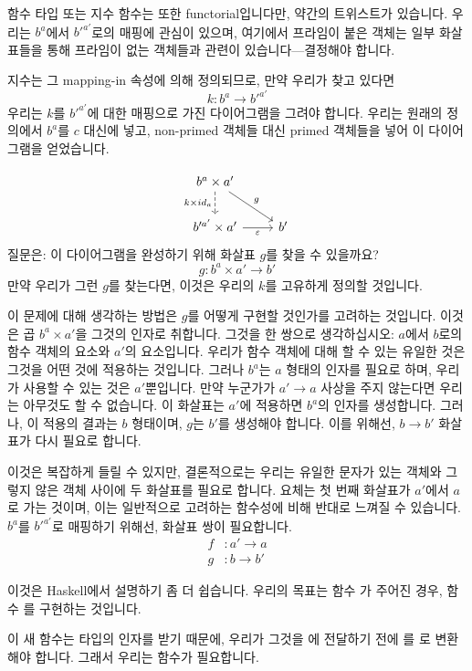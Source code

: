 \documentclass[DaoFP]{subfiles}
\begin{document}
함수 타입 또는 지수 함수는 또한 functorial입니다만, 약간의 트위스트가 있습니다. 우리는 $b^a$에서 $b'^{a'}$로의 매핑에 관심이 있으며, 여기에서 프라임이 붙은 객체는 일부 화살표들을 통해 프라임이 없는 객체들과 관련이 있습니다---결정해야 합니다.

지수는 그 mapping-in 속성에 의해 정의되므로, 만약 우리가 찾고 있다면
\[k \colon b^a \to b'^{a'} \]
우리는 $k$를 $b'^{a'}$에 대한 매핑으로 가진 다이어그램을 그려야 합니다. 우리는 원래의 정의에서 $b^a$를 $c$ 대신에 넣고, non-primed 객체들 대신 primed 객체들을 넣어 이 다이어그램을 얻었습니다.

\[
 \begin{tikzcd}
 b^a \times a'
 \arrow[d, dashed, "k \times id_a"']
 \arrow[rd, "g"]
 \\
 b'^{a'} \times a'
 \arrow[r, "\varepsilon"']
& b'
 \end{tikzcd}
\]
질문은: 이 다이어그램을 완성하기 위해 화살표 $g$를 찾을 수 있을까요?
\[g \colon b^a \times a' \to b'\]
만약 우리가 그런 $g$를 찾는다면, 이것은 우리의 $k$를 고유하게 정의할 것입니다.

이 문제에 대해 생각하는 방법은 $g$를 어떻게 구현할 것인가를 고려하는 것입니다. 이것은 곱 $b^a \times a'$을 그것의 인자로 취합니다. 그것을 한 쌍으로 생각하십시오: $a$에서 $b$로의 함수 객체의 요소와 $a'$의 요소입니다. 우리가 함수 객체에 대해 할 수 있는 유일한 것은 그것을 어떤 것에 적용하는 것입니다. 그러나 $b^a$는 $a$ 형태의 인자를 필요로 하며, 우리가 사용할 수 있는 것은 $a'$뿐입니다. 만약 누군가가 $a' \to a$ 사상을 주지 않는다면 우리는 아무것도 할 수 없습니다. 이 화살표는 $a'$에 적용하면 $b^a$의 인자를 생성합니다. 그러나, 이 적용의 결과는 $b$ 형태이며, $g$는 $b'$를 생성해야 합니다. 이를 위해선, $b \to b'$ 화살표가 다시 필요로 합니다.

이것은 복잡하게 들릴 수 있지만, 결론적으로는 우리는 유일한 문자가 있는 객체와 그렇지 않은 객체 사이에 두 화살표를 필요로 합니다. 요체는 첫 번째 화살표가 $a'$에서 $a$로 가는 것이며, 이는 일반적으로 고려하는 함수성에 비해 반대로 느껴질 수 있습니다. $b^a$를 $b'^{a'}$로 매핑하기 위해선, 화살표 쌍이 필요합니다.
\begin{align*}
f &\colon a' \to a \\
g &\colon b \to b' 
\end{align*}

이것은 Haskell에서 설명하기 좀 더 쉽습니다. 우리의 목표는 함수 가 주어진 경우, 함수 를 구현하는 것입니다.

이 새 함수는  타입의 인자를 받기 때문에, 우리가 그것을 에 전달하기 전에 를 로 변환해야 합니다. 그래서 우리는  함수가 필요합니다.
\end{document}
